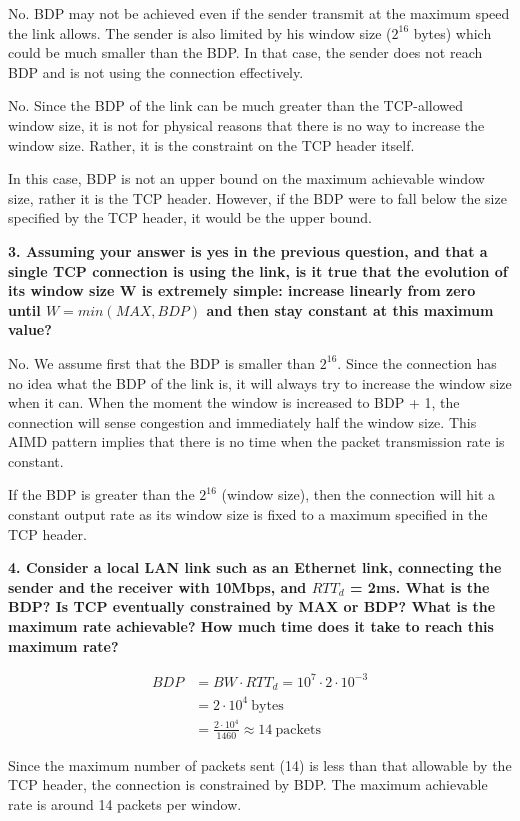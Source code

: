 \documentclass[]{article}
\newcommand{\e}{&=}
\begin{document}
No. BDP may not be achieved even if the sender transmit at the maximum speed the link allows. The sender is also limited by his window size ($2^{16}$ bytes) which could be much smaller than the BDP. In that case, the sender does not reach BDP and is not using the connection effectively.

No. Since the BDP of the link can be much greater than the TCP-allowed window size, it is not for physical reasons that there is no way to increase the window size. Rather, it is the constraint on the TCP header itself.

In this case, BDP is not an upper bound on the maximum achievable window size, rather it is the TCP header. However, if the BDP were to fall below the size specified by the TCP header, it would be the upper bound.

\textbf{3. Assuming your answer is yes in the previous question, and that a single TCP connection is using the link, is it true that the evolution of its window size W is extremely simple: increase linearly from zero until $W	= min(MAX, BDP)$ and then stay constant at this maximum value?}

No. We assume first that the BDP is smaller than $2^{16}$. Since the connection has no idea what the BDP of the link is, it will always try to increase the window size when it can. When the moment the window is increased to BDP + 1, the connection will sense congestion and immediately half the window size. This AIMD pattern implies that there is no time when the packet transmission rate is constant.

If the BDP is greater than the $2^{16}$ (window size), then the connection will hit a constant output rate as its window size is fixed to a maximum specified in the TCP header.

\textbf{4. Consider a local LAN link such as an Ethernet link, connecting the sender and the receiver with 10Mbps, and $RTT_d$ = 2ms. What is the BDP? Is TCP eventually constrained by MAX or BDP? What is the maximum rate achievable? How much time does it take to reach this maximum rate?}

\begin{align*}
BDP \e BW \cdot RTT_d = 10^7 \cdot 2 \cdot 10^{-3} \\
	\e 2 \cdot 10^4\ \text{bytes} \\
	\e \frac{2 \cdot 10^4}{1460} \approx 14\ \text{packets}
\end{align*}

Since the maximum number of packets sent (14) is less than that allowable by the TCP header, the connection is constrained by BDP. The maximum achievable rate is around 14 packets per window. 
\end{document}

